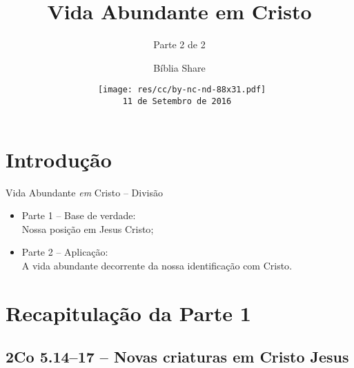 \documentclass[12pt,aspectratio=169]{beamer}
\title{Vida Abundante em Cristo}
\subtitle{Parte 2 de 2}
\author{Bíblia Share}
\date[{\tiny\tt 11 de Setembro de 2016}]{{\scriptsize\tt%
    \texttt{[image: res/cc/by-nc-nd-88x31.pdf]}\\[\smallskipamount]
    11 de Setembro de 2016
}}
\newcommand{\YEL}[1]{{\textcolor{TXyel}{#1}}}
\newcommand{\CYA}[1]{{\textcolor{TXcya}{#1}}}
\newcommand{\MAG}[1]{{\textcolor{TXmag}{#1}}}
\newcommand{\BRI}[1]{{\textcolor{BSpbg}{#1}}}   %
\begin{document}
\begin{frame}
    \titlepage
\end{frame}
\section{Introdução}

    \begin{frame}{\BRI{Vida Abundante} \YEL{\emph{em} Cristo} -- Divisão}
        \begin{itemize}
            \item \BRI{Parte 1} -- Base de verdade:\\
                Nossa \YEL{posição} \MAG{em Jesus Cristo};
                \\[\bigskipamount]
            \item \BRI{Parte 2} -- Aplicação:\\
                A \CYA{vida abundante} decorrente da nossa \YEL{identificação}
                \MAG{com Cristo}.
        \end{itemize}
    \end{frame}

\section{Recapitulação da Parte 1}

    \subsection{2Co 5.14--17 -- Novas criaturas em Cristo Jesus}
\end{document}
